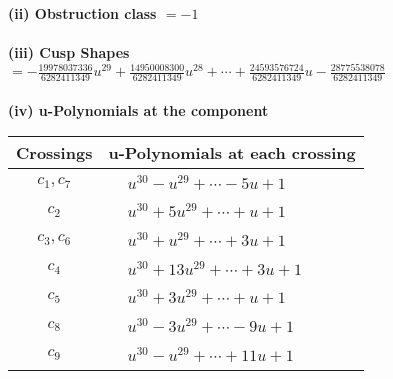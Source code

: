 \documentclass[1p]{elsarticle_modified}
\theoremstyle{definition}
\begin{document}
\flushleft \textbf{(ii) Obstruction class $= -1$}\\~\\
\flushleft \textbf{(iii) Cusp Shapes $= -\frac{19978037336}{6282411349} u^{29}+\frac{14950008300}{6282411349} u^{28}+\cdots+\frac{24593576724}{6282411349} u-\frac{28775538078}{6282411349}$}\\~\\
\newpage\renewcommand{\arraystretch}{1}
\flushleft \textbf{(iv) u-Polynomials at the component}\newline \\
\begin{tabular}{m{50pt}|m{274pt}}
Crossings & \hspace{64pt}u-Polynomials at each crossing \\
\hline $$\begin{aligned}c_{1},c_{7}\end{aligned}$$&$\begin{aligned}
&u^{30}- u^{29}+\cdots-5 u+1
\end{aligned}$\\
\hline $$\begin{aligned}c_{2}\end{aligned}$$&$\begin{aligned}
&u^{30}+5 u^{29}+\cdots+u+1
\end{aligned}$\\
\hline $$\begin{aligned}c_{3},c_{6}\end{aligned}$$&$\begin{aligned}
&u^{30}+u^{29}+\cdots+3 u+1
\end{aligned}$\\
\hline $$\begin{aligned}c_{4}\end{aligned}$$&$\begin{aligned}
&u^{30}+13 u^{29}+\cdots+3 u+1
\end{aligned}$\\
\hline $$\begin{aligned}c_{5}\end{aligned}$$&$\begin{aligned}
&u^{30}+3 u^{29}+\cdots+u+1
\end{aligned}$\\
\hline $$\begin{aligned}c_{8}\end{aligned}$$&$\begin{aligned}
&u^{30}-3 u^{29}+\cdots-9 u+1
\end{aligned}$\\
\hline $$\begin{aligned}c_{9}\end{aligned}$$&$\begin{aligned}
&u^{30}- u^{29}+\cdots+11 u+1
\end{aligned}$\\
\hline
\end{tabular}\\~\\
\end{document}
